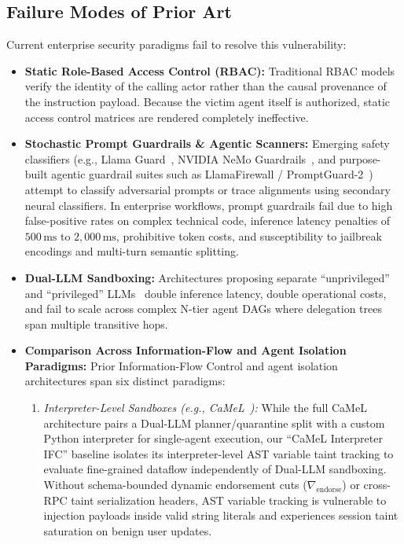 \documentclass[conference,10pt]{IEEEtran}
\begin{document}
\subsection{Failure Modes of Prior Art}
Current enterprise security paradigms fail to resolve this vulnerability:
\begin{itemize}
    \item \textbf{Static Role-Based Access Control (RBAC):} Traditional RBAC models~\cite{sandhu1996role} verify the identity of the calling actor rather than the causal provenance of the instruction payload. Because the victim agent itself is authorized, static access control matrices are rendered completely ineffective.
    \item \textbf{Stochastic Prompt Guardrails \& Agentic Scanners:} Emerging safety classifiers (e.g., Llama Guard~\cite{inan2023llama}, NVIDIA NeMo Guardrails~\cite{rebedea2023nemo}, and purpose-built agentic guardrail suites such as LlamaFirewall / PromptGuard-2~\cite{chennabasappa2025llamafirewall}) attempt to classify adversarial prompts or trace alignments using secondary neural classifiers. In enterprise workflows, prompt guardrails fail due to high false-positive rates on complex technical code, inference latency penalties of $500\,\text{ms}$ to $2{,}000\,\text{ms}$, prohibitive token costs, and susceptibility to jailbreak encodings and multi-turn semantic splitting.
    \item \textbf{Dual-LLM Sandboxing:} Architectures proposing separate ``unprivileged'' and ``privileged'' LLMs~\cite{willison2023dual} double inference latency, double operational costs, and fail to scale across complex N-tier agent DAGs where delegation trees span multiple transitive hops.
    \item \textbf{Comparison Across Information-Flow and Agent Isolation Paradigms:} Prior Information-Flow Control and agent isolation architectures span six distinct paradigms:
    \begin{enumerate}
        \item \textit{Interpreter-Level Sandboxes (e.g., CaMeL~\cite{debenedetti2025camel}):} While the full CaMeL architecture pairs a Dual-LLM planner/quarantine split with a custom Python interpreter for single-agent execution, our ``CaMeL Interpreter IFC'' baseline isolates its interpreter-level AST variable taint tracking to evaluate fine-grained dataflow independently of Dual-LLM sandboxing. Without schema-bounded dynamic endorsement cuts ($\nabla_{\text{endorse}}$) or cross-RPC taint serialization headers, AST variable tracking is vulnerable to injection payloads inside valid string literals and experiences session taint saturation on benign user updates.

\end{enumerate}
\end{itemize}
\end{document}
